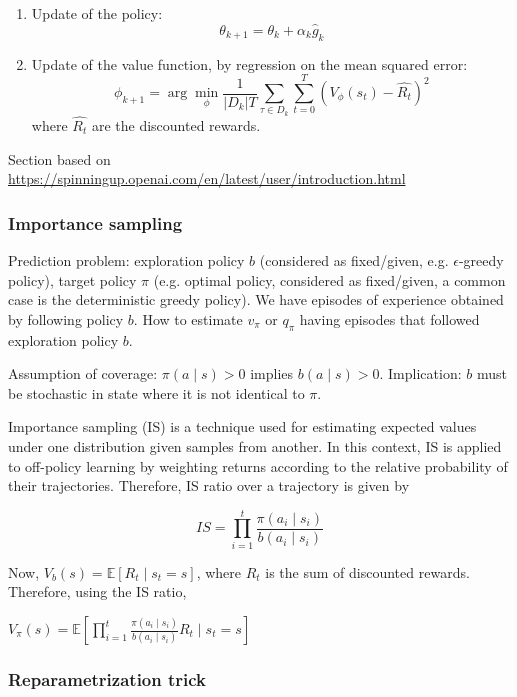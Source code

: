 \documentclass[12pt, english]{article}
\begin{document}
\begin{enumerate}
  \item Update of the policy:
  $$\theta_{k+1} = \theta_k + \alpha_k \hat{g}_k$$
  \item Update of the value function, by regression on the mean squared error:
  $$\phi_{k+1} = \arg\min_\phi \frac{1}{|D_k|T} \sum_{\tau \in D_k} \sum_{t=0}^T (V_\phi(s_t) - \hat{R_t})^2$$
  where $\hat{R_t}$ are the discounted rewards.
\end{enumerate}

Section based on \url{https://spinningup.openai.com/en/latest/user/introduction.html}

\subsubsection{Importance sampling}

Prediction problem: exploration policy $b$ (considered as fixed/given, e.g. $\epsilon$-greedy policy), target policy $\pi$ (e.g. optimal policy, considered as fixed/given, a common case is the deterministic greedy policy). We have episodes of experience obtained by following policy $b$. How to estimate $v_\pi$ or $q_\pi$ having episodes that followed exploration policy $b$.

Assumption of coverage: $\pi(a \mid s) > 0$ implies $b(a \mid s) > 0$. Implication: $b$ must be stochastic in state where it is not identical to $\pi$.

Importance sampling (IS) is a technique used for estimating expected values under one distribution given samples from another. In this context, IS is applied to off-policy learning by weighting returns according to the relative probability of their trajectories. Therefore, IS ratio over a trajectory is given by

\begin{equation}
  IS = \prod_{i=1}^t \frac{\pi(a_i \mid s_i)}{b(a_i \mid s_i)}
\end{equation}

Now, $V_b (s) = \mathbb{E} [R_t \mid s_t = s]$, where $R_t$ is the sum of discounted rewards. Therefore, using the IS ratio,

$V_\pi (s) = \mathbb{E} [\prod_{i=1}^t \frac{\pi(a_i \mid s_i)}{b(a_i \mid s_i)} R_t \mid s_t = s]$

\subsubsection{Reparametrization trick}
\end{document}
